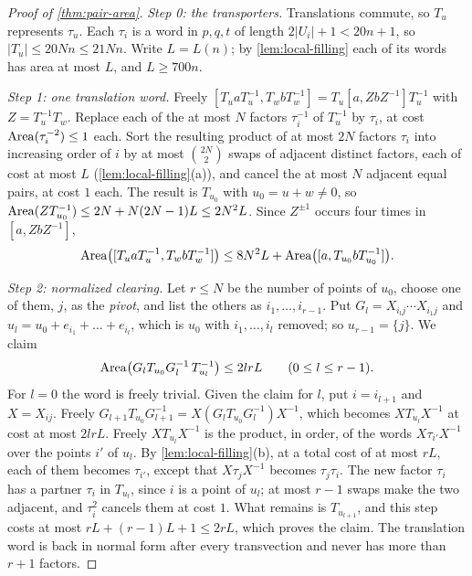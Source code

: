 \begin{proof}[Proof of \cref{thm:pair-area}]
\emph{Step 0: the transporters.} Translations commute, so $T_u$ represents $\tau_u$. Each $\tau_i$ is a word in $p,q,t$ of length
$2|U_i|+1<20n+1$, so $|T_u|\le20Nn\le21Nn$. Write $L=L(n)$; by \cref{lem:local-filling} each of its words has area at most $L$, and
$L\ge700n$.

\emph{Step 1: one translation word.} Freely $[T_uaT_u^{-1},T_wbT_w^{-1}]=T_u[a,ZbZ^{-1}]T_u^{-1}$ with $Z=T_u^{-1}T_w$. Replace each of the
at most $N$ factors $\tau_i^{-1}$ of $T_u^{-1}$ by $\tau_i$, at cost $\operatorname{Area}(\tau_i^{-2})\le1$ each. Sort the resulting product of at most $2N$
factors $\tau_i$ into increasing order of $i$ by at most $\binom{2N}2$ swaps of adjacent distinct factors, each of cost at most $L$
(\cref{lem:local-filling}(a)), and cancel the at most $N$ adjacent equal pairs, at cost $1$ each. The result is $T_{u_0}$ with
$u_0=u+w\ne0$, so $\operatorname{Area}(ZT_{u_0}^{-1})\le2N+N(2N-1)L\le2N^2L$. Since $Z^{\pm1}$ occurs four times in $[a,ZbZ^{-1}]$,
\[
\operatorname{Area}\bigl([T_uaT_u^{-1},T_wbT_w^{-1}]\bigr)\le8N^2L+\operatorname{Area}\bigl([a,T_{u_0}bT_{u_0}^{-1}]\bigr).
\]

\emph{Step 2: normalized clearing.} Let $r\le N$ be the number of points of $u_0$, choose one of them, $j$, as the \emph{pivot}, and list the
others as $i_1,\dots,i_{r-1}$. Put $G_l=X_{i_lj}\cdots X_{i_1j}$ and $u_l=u_0+e_{i_1}+\dots+e_{i_l}$, which is $u_0$ with $i_1,\dots,i_l$
removed; so $u_{r-1}=\{j\}$. We claim
\[
\operatorname{Area}\bigl(G_lT_{u_0}G_l^{-1}\,T_{u_l}^{-1}\bigr)\le2lrL\qquad(0\le l\le r-1).
\]
For $l=0$ the word is freely trivial. Given the claim for $l$, put $i=i_{l+1}$ and $X=X_{ij}$. Freely
$G_{l+1}T_{u_0}G_{l+1}^{-1}=X(G_lT_{u_0}G_l^{-1})X^{-1}$, which becomes $XT_{u_l}X^{-1}$ at cost at most $2lrL$. Freely $XT_{u_l}X^{-1}$ is
the product, in order, of the words $X\tau_{i'}X^{-1}$ over the points $i'$ of $u_l$. By \cref{lem:local-filling}(b), at a total cost of at
most $rL$, each of them becomes $\tau_{i'}$, except that $X\tau_jX^{-1}$ becomes $\tau_j\tau_i$. The new factor $\tau_i$ has a partner
$\tau_i$ in $T_{u_l}$, since $i$ is a point of $u_l$; at most $r-1$ swaps make the two adjacent, and $\tau_i^2$ cancels them at cost $1$.
What remains is $T_{u_{l+1}}$, and this step costs at most $rL+(r-1)L+1\le2rL$, which proves the claim. The translation word is back in
normal form after every transvection and never has more than $r+1$ factors.


\end{proof}

